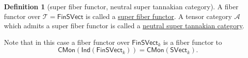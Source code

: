 \documentclass[a4paper,10pt]{scrreprt}
\newcommand{\N}{\mathbb{N}}
\newcommand{\defn}[1]{\ul{#1}}
\newcommand{\Obj}{\mathrm{Obj}}
\theoremstyle{definition}
\newtheorem{definition}{Definition}[section]
\theoremstyle{plain}
\theoremstyle{remark}
\begin{document}
\begin{definition}[super fiber functor, neutral super tannakian category]
  \label{def:suberfiberfunctorneutralsupertannakiancategory}
  A fiber functor over $\mathscr{T} = \mathsf{FinSVect}$ is called a \defn{super fiber functor}. A tensor category $\mathscr{A}$ which admits a super fiber functor is called a \defn{neutral super tannakian category}.

  Note that in this case a fiber functor over $\mathsf{FinSVect}_{k}$ is a fiber functor to
  \begin{equation*}
    \mathsf{CMon}(\mathsf{Ind}(\mathsf{FinSVect}_{k})) = \mathsf{CMon}(\mathsf{SVect}_{k}).
  \end{equation*}
\end{definition}

%
%
%
\end{document}
